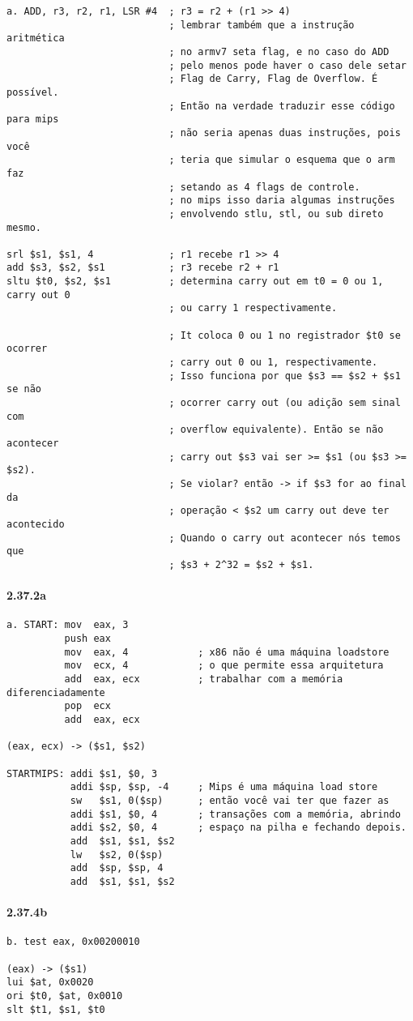 \documentclass{article}
\begin{document}
\begin{verbatim}
a. ADD, r3, r2, r1, LSR #4  ; r3 = r2 + (r1 >> 4)
                            ; lembrar também que a instrução aritmética
                            ; no armv7 seta flag, e no caso do ADD
                            ; pelo menos pode haver o caso dele setar
                            ; Flag de Carry, Flag de Overflow. É possível.
                            ; Então na verdade traduzir esse código para mips
                            ; não seria apenas duas instruções, pois você
                            ; teria que simular o esquema que o arm faz
                            ; setando as 4 flags de controle.
                            ; no mips isso daria algumas instruções
                            ; envolvendo stlu, stl, ou sub direto mesmo.

srl $s1, $s1, 4             ; r1 recebe r1 >> 4
add $s3, $s2, $s1           ; r3 recebe r2 + r1
sltu $t0, $s2, $s1          ; determina carry out em t0 = 0 ou 1, carry out 0
                            ; ou carry 1 respectivamente.

                            ; It coloca 0 ou 1 no registrador $t0 se ocorrer
                            ; carry out 0 ou 1, respectivamente.
                            ; Isso funciona por que $s3 == $s2 + $s1 se não
                            ; ocorrer carry out (ou adição sem sinal com
                            ; overflow equivalente). Então se não acontecer
                            ; carry out $s3 vai ser >= $s1 (ou $s3 >= $s2).
                            ; Se violar? então -> if $s3 for ao final da
                            ; operação < $s2 um carry out deve ter acontecido
                            ; Quando o carry out acontecer nós temos que
                            ; $s3 + 2^32 = $s2 + $s1.
\end{verbatim}

\paragraph{2.37.2a}

\begin{verbatim}
a. START: mov  eax, 3
          push eax
          mov  eax, 4            ; x86 não é uma máquina loadstore
          mov  ecx, 4            ; o que permite essa arquitetura
          add  eax, ecx          ; trabalhar com a memória diferenciadamente
          pop  ecx
          add  eax, ecx

(eax, ecx) -> ($s1, $s2)

STARTMIPS: addi $s1, $0, 3
           addi $sp, $sp, -4     ; Mips é uma máquina load store
           sw   $s1, 0($sp)      ; então você vai ter que fazer as
           addi $s1, $0, 4       ; transações com a memória, abrindo
           addi $s2, $0, 4       ; espaço na pilha e fechando depois.
           add  $s1, $s1, $s2
           lw   $s2, 0($sp)
           add  $sp, $sp, 4
           add  $s1, $s1, $s2
\end{verbatim}

\paragraph{2.37.4b}

\begin{verbatim}
b. test eax, 0x00200010

(eax) -> ($s1)
lui $at, 0x0020
ori $t0, $at, 0x0010
slt $t1, $s1, $t0
\end{verbatim}
\end{document}
